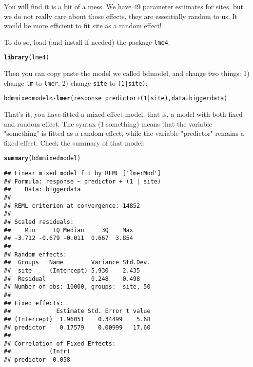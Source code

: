 \documentclass[12pt,a4paper]{scrartcl}\usepackage[]{graphicx}\usepackage[]{color}
\makeatletter
\newcommand{\hlnum}[1]{\textcolor[rgb]{0.686,0.059,0.569}{#1}}%
\newcommand{\hlopt}[1]{\textcolor[rgb]{0,0,0}{#1}}%
\newcommand{\hlstd}[1]{\textcolor[rgb]{0.345,0.345,0.345}{#1}}%
\newcommand{\hlkwb}[1]{\textcolor[rgb]{0.69,0.353,0.396}{#1}}%
\newcommand{\hlkwc}[1]{\textcolor[rgb]{0.333,0.667,0.333}{#1}}%
\newcommand{\hlkwd}[1]{\textcolor[rgb]{0.737,0.353,0.396}{\textbf{#1}}}%
\newenvironment{kframe}{%
 \def\at@end@of@kframe{}%
 \ifinner\ifhmode%
  \def\at@end@of@kframe{\end{minipage}}%
  \begin{minipage}{\columnwidth}%
 \fi\fi%
 \def\FrameCommand##1{\hskip\@totalleftmargin \hskip-\fboxsep
 \colorbox{shadecolor}{##1}\hskip-\fboxsep
     \hskip-\linewidth \hskip-\@totalleftmargin \hskip\columnwidth}%
 \MakeFramed {\advance\hsize-\width
   \@totalleftmargin\z@ \linewidth\hsize
   \@setminipage}}%
 {\par\unskip\endMakeFramed%
 \at@end@of@kframe}
\newenvironment{knitrout}{}{} %
\makeatother
\begin{document}
You will find it is a bit of a mess. We have 49 parameter estimates for sites, but we do not really care about those effects, they are essentially random to us. It would be more efficient to fit site as a random effect!

To do so, load (and install if needed) the package \texttt{lme4}. 
\begin{knitrout}
\color{fgcolor}\begin{kframe}
\begin{alltt}
\hlkwd{library}\hlstd{(lme4)}
\end{alltt}


{\ttfamily\noindent\itshape\color{messagecolor}{\#\# Loading required package: Matrix}}\end{kframe}
\end{knitrout}
Then you can copy paste the model we called bdmodel, and change two things: 1) change \texttt{lm} to \texttt{lmer}; 2) change \texttt{site} to \texttt{(1|site)}:

\begin{knitrout}
\color{fgcolor}\begin{kframe}
\begin{alltt}
\hlstd{bdmmixedmodel} \hlkwb{<-} \hlkwd{lmer}\hlstd{(response} \hlopt{~} \hlstd{predictor} \hlopt{+} \hlstd{(}\hlnum{1}\hlopt{|}\hlstd{site),} \hlkwc{data} \hlstd{= biggerdata)}
\end{alltt}
\end{kframe}
\end{knitrout}
That's it, you have fitted a mixed effect model: that is, a model with both fixed and random effect. The syntax (1|something) means that the variable "something" is fitted as a random effect, while the variable "predictor" remains a fixed effect. Check the summary of that model:
\begin{knitrout}
\color{fgcolor}\begin{kframe}
\begin{alltt}
\hlkwd{summary}\hlstd{(bdmmixedmodel)}
\end{alltt}
\begin{verbatim}
## Linear mixed model fit by REML ['lmerMod']
## Formula: response ~ predictor + (1 | site)
##    Data: biggerdata
## 
## REML criterion at convergence: 14852
## 
## Scaled residuals: 
##    Min     1Q Median     3Q    Max 
## -3.712 -0.679 -0.011  0.667  3.854 
## 
## Random effects:
##  Groups   Name        Variance Std.Dev.
##  site     (Intercept) 5.930    2.435   
##  Residual             0.248    0.498   
## Number of obs: 10000, groups:  site, 50
## 
## Fixed effects:
##             Estimate Std. Error t value
## (Intercept)  1.96051    0.34499    5.68
## predictor    0.17579    0.00999   17.60
## 
## Correlation of Fixed Effects:
##           (Intr)
## predictor -0.058
\end{verbatim}
\end{kframe}
\end{knitrout}
\end{document}
